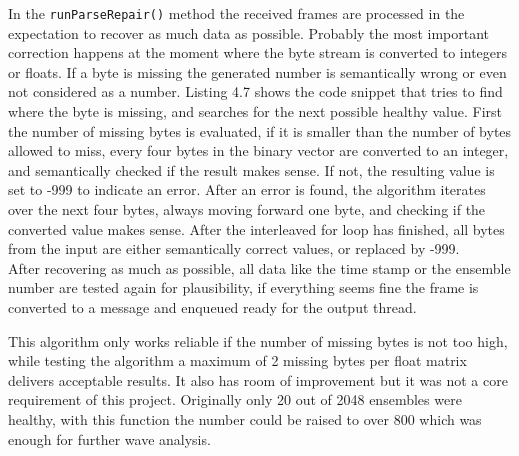In the \texttt{runParseRepair()} method the received frames are processed in the expectation to recover as much data as possible. Probably the most important correction happens at the moment where the byte stream is converted to integers or floats. If a byte is missing the generated number is semantically wrong or even not considered as a number. Listing 4.7 shows the code snippet that tries to find where the byte is missing, and searches for the next possible healthy value. First the number of missing bytes is evaluated, if it is smaller than the number of bytes allowed to miss, every four bytes in the binary vector are converted to an integer, and semantically checked if the result makes sense. If not, the resulting value is set to -999 to indicate an error. After an error is found, the algorithm iterates over the next four bytes, always moving forward one byte, and checking if the converted value makes sense. After the interleaved for loop has finished, all bytes from the input are either semantically correct values, or replaced by -999.\\
After recovering as much as possible, all data like the time stamp or the ensemble number are tested again for plausibility, if everything seems fine the frame is converted to a message and enqueued ready for the output thread.

This algorithm only works reliable if the number of missing bytes is not too high, while testing the algorithm a maximum of 2 missing bytes per float matrix delivers acceptable results. It also has room of improvement but it was not a core requirement of this project. Originally only 20 out of 2048 ensembles were healthy, with this function the number could be raised to over 800 which was enough for further wave analysis.
\vspace{20em}
\pagebreak

